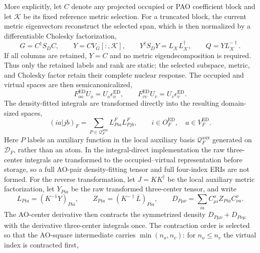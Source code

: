 \documentclass[11pt]{article}
\begin{document}
More explicitly, let $C$ denote any projected occupied or PAO coefficient
block and let $\mathcal K$ be its fixed reference metric selection.  For a
truncated block, the current metric eigenvectors reconstruct the selected
span, which is then normalized by a differentiable Cholesky factorization,
\begin{equation}
 G=C^\dagger S_D C,\qquad
 Y=CV_G[:,\mathcal K],\qquad
 Y^\dagger S_DY=L_{\mathcal K}L_{\mathcal K}^\dagger,\qquad
 Q=YL_{\mathcal K}^{-\dagger}.
 \label{eq:workflow-fixed-metric-frame}
\end{equation}
If all columns are retained, $Y=C$ and no metric eigendecomposition is
required.  Thus only the retained labels and rank are static; the selected
subspace, metric, and Cholesky factor retain their complete nuclear response.
The occupied and virtual spaces are then semicanonicalized,
\begin{equation}
 F_{oo}^{\mathrm{ED}}U_o=U_o\epsilon_o^{\mathrm{ED}},
 \qquad
 F_{vv}^{\mathrm{ED}}U_v=U_v\epsilon_v^{\mathrm{ED}}.
 \label{eq:workflow-ed-semicanonical}
\end{equation}
The density-fitted integrals are transformed directly into the resulting
domain-sized spaces,
\begin{equation}
 (ia|jb)_F=\sum_{P\in\mathcal Q_F^{\mathrm{aux}}}
 L_{Pia}^{F}L_{Pjb}^{F},\qquad
 i\in O_F^{\mathrm{ED}},\quad
 a\in V_F^{\mathrm{ED}}.
 \label{eq:workflow-domain-lov}
\end{equation}
Here $P$ labels an auxiliary function in the local auxiliary basis
$\mathcal Q_F^{\mathrm{aux}}$ generated on $\mathcal D_F$, rather than an
atom.  In the integral-direct implementation the raw three-center integrals
are transformed to the occupied--virtual representation before storage, so a
full AO-pair density-fitting tensor and full four-index ERIs are not formed.
For the reverse transformation, let $J=KK^\dagger$ be the local auxiliary
metric factorization, let $Y_{Pia}$ be the raw transformed three-center
tensor, and write
\begin{equation}
 L_{Pia}=\left(K^{-1}Y\right)_{Pia},\qquad
 Z_{Pia}=\left(K^{-\dagger}\overline L\right)_{Pia},\qquad
 D_{P\mu\nu}=\sum_{ia}C^o_{\mu i}Z_{Pia}C^v_{\nu a}.
 \label{eq:workflow-direct-ri-reverse}
\end{equation}
The AO-center derivative then contracts the symmetrized density
$D_{P\mu\nu}+D_{P\nu\mu}$ with the derivative three-center integrals once.
The contraction order is selected so that the AO-square intermediate carries
$\min(n_o,n_v)$: for $n_o\leq n_v$ the virtual index is contracted first,
\end{document}
